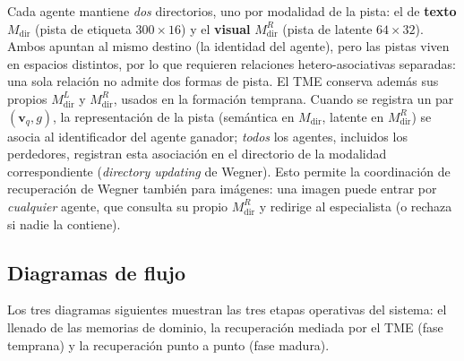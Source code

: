 Cada agente mantiene \emph{dos} directorios, uno por modalidad de la pista: el de
\textbf{texto} $M_{\mathrm{dir}}$ (pista de etiqueta $300\times16$) y el \textbf{visual}
$M^R_{\mathrm{dir}}$ (pista de latente $64\times32$). Ambos apuntan al mismo destino (la
identidad del agente), pero las pistas viven en espacios distintos, por lo que requieren
relaciones hetero-asociativas separadas: una sola relación no admite dos formas de pista.
El TME conserva además sus propios $M^L_{\mathrm{dir}}$ y $M^R_{\mathrm{dir}}$, usados en
la formación temprana.
Cuando se registra un par $(\mathbf{v}_q, g)$, la representación de la pista (semántica en
$M_{\mathrm{dir}}$, latente en $M^R_{\mathrm{dir}}$) se asocia al identificador del agente
ganador; \emph{todos} los agentes, incluidos los perdedores, registran esta asociación en
el directorio de la modalidad correspondiente (\emph{directory updating} de Wegner).
Esto permite la coordinación de recuperación de Wegner también para imágenes: una imagen
puede entrar por \emph{cualquier} agente, que consulta su propio $M^R_{\mathrm{dir}}$ y
redirige al especialista (o rechaza si nadie la contiene).

\subsection{Diagramas de flujo}
\label{sec:diagramas}

Los tres diagramas siguientes muestran las tres etapas operativas del sistema:
el llenado de las memorias de dominio, la recuperación mediada por el TME (fase temprana)
y la recuperación punto a punto (fase madura).

